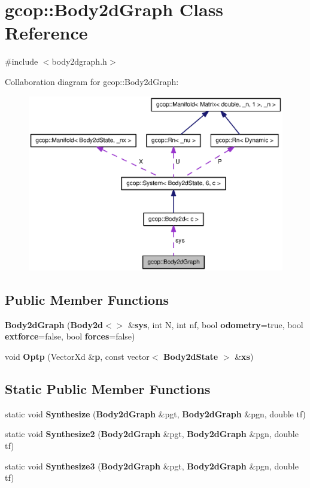 \section{gcop\-:\-:\-Body2d\-Graph \-Class \-Reference}
\label{classgcop_1_1Body2dGraph}


{\ttfamily \#include $<$body2dgraph.\-h$>$}



\-Collaboration diagram for gcop\-:\-:\-Body2d\-Graph\-:
\nopagebreak
\begin{figure}[H]
\begin{center}
\leavevmode
\includegraphics[width=350pt]{classgcop_1_1Body2dGraph__coll__graph}
\end{center}
\end{figure}
\subsection*{\-Public \-Member \-Functions}
\begin{DoxyCompactItemize}
\item 
{\bf \-Body2d\-Graph} ({\bf \-Body2d}$<$$>$ \&{\bf sys}, int \-N, int nf, bool {\bf odometry}=true, bool {\bf extforce}=false, bool {\bf forces}=false)
\item 
void {\bf \-Optp} (\-Vector\-Xd \&{\bf p}, const vector$<$ {\bf \-Body2d\-State} $>$ \&{\bf xs})
\end{DoxyCompactItemize}
\subsection*{\-Static \-Public \-Member \-Functions}
\begin{DoxyCompactItemize}
\item 
static void {\bf \-Synthesize} ({\bf \-Body2d\-Graph} \&pgt, {\bf \-Body2d\-Graph} \&pgn, double tf)
\item 
static void {\bf \-Synthesize2} ({\bf \-Body2d\-Graph} \&pgt, {\bf \-Body2d\-Graph} \&pgn, double tf)
\item 
static void {\bf \-Synthesize3} ({\bf \-Body2d\-Graph} \&pgt, {\bf \-Body2d\-Graph} \&pgn, double tf)
\end{DoxyCompactItemize}
